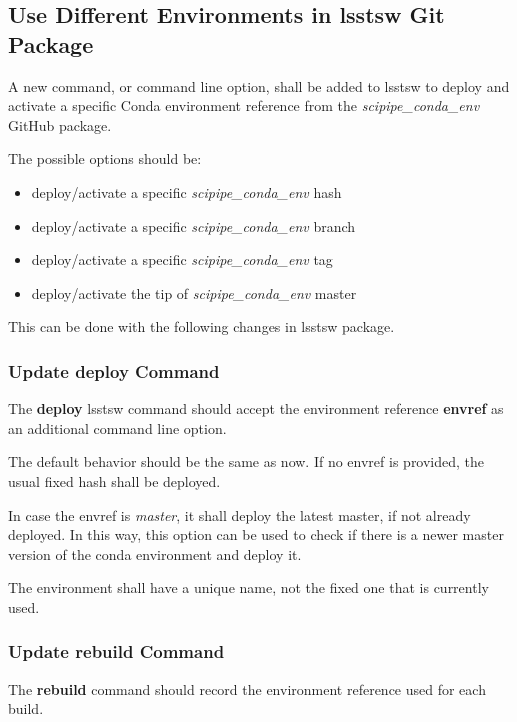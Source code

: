 \subsection{Use Different Environments in lsstsw Git Package} \label{sec:envActivate}

A new command, or command line option, shall be added to lsstsw to deploy and activate a specific Conda environment reference from the \textit{scipipe\_conda\_env} GitHub package.

The possible options should be:

\begin{itemize}
\item deploy/activate a specific \textit{scipipe\_conda\_env} hash
\item deploy/activate a specific \textit{scipipe\_conda\_env} branch
\item deploy/activate a specific \textit{scipipe\_conda\_env} tag
\item deploy/activate the tip of \textit{scipipe\_conda\_env} master
\end{itemize}

This can be done with the following changes in lsstsw package.


\subsubsection{Update deploy Command} \label{sec:deploy}

The \textbf{deploy} lsstsw command should accept the environment reference \textbf{envref}  as an additional command line option.

The default behavior should be the same as now. If no envref is provided, the usual fixed hash shall be deployed. 

In case the envref is \textit{master}, it shall deploy the latest master, if not already deployed.
In this way, this option can be used to check if there is a newer master version of the conda environment and deploy it.

The environment shall have a unique name, not the fixed one that is currently used.


\subsubsection{Update rebuild Command} \label{sec:rebuild}

The \textbf{rebuild} command should record the environment reference used for each build.

